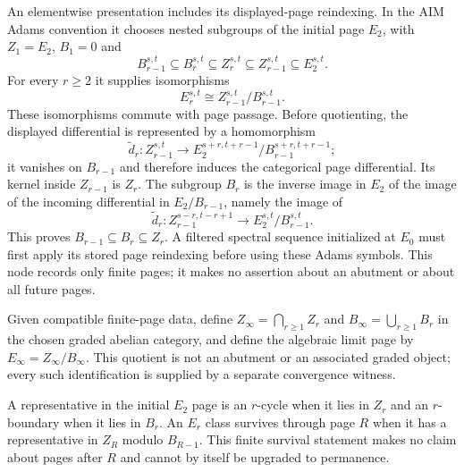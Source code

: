\begin{definition}
  \label{def:ss-elementwise-page-presentation}
  \notready
  An elementwise presentation includes its displayed-page reindexing.  In the
  AIM Adams convention it chooses nested subgroups of the initial page
  $E_2$, with $Z_1=E_2$, $B_1=0$ and
  \[
    B_{r-1}^{s,t}\subseteq B_r^{s,t}\subseteq Z_r^{s,t}
      \subseteq Z_{r-1}^{s,t}\subseteq E_2^{s,t}.
  \]
  For every $r\ge2$ it supplies isomorphisms
  \[
    E_r^{s,t}\cong Z_{r-1}^{s,t}/B_{r-1}^{s,t}.
  \]
  These isomorphisms commute with page passage.  Before quotienting, the
  displayed differential is represented by a homomorphism
  \[
    \widetilde d_r:Z_{r-1}^{s,t}\longrightarrow
    E_2^{s+r,t+r-1}/B_{r-1}^{s+r,t+r-1};
  \]
  it vanishes on $B_{r-1}$ and therefore induces the categorical page
  differential.  Its kernel inside $Z_{r-1}$ is $Z_r$.  The subgroup $B_r$
  is the inverse image in $E_2$ of the image of the incoming differential in
  $E_2/B_{r-1}$, namely the image of
  \[
    \widetilde d_r:Z_{r-1}^{s-r,t-r+1}
      \longrightarrow E_2^{s,t}/B_{r-1}^{s,t}.
  \]
  This proves $B_{r-1}\subseteq B_r\subseteq Z_r$.
  A filtered spectral sequence initialized at $E_0$ must first apply its
  stored page reindexing before using these Adams symbols.  This node records
  only finite pages; it makes no assertion about an abutment or about all
  future pages.
\end{definition}

\begin{definition}
  \label{def:ss-einfty-presentation}
  \notready
  Given compatible finite-page data, define
  $Z_\infty=\bigcap_{r\ge1}Z_r$ and
  $B_\infty=\bigcup_{r\ge1}B_r$ in the chosen graded abelian category, and
  define the algebraic limit page by $E_\infty=Z_\infty/B_\infty$.
  This quotient is not an abutment or an associated graded object; every such
  identification is supplied by a separate convergence witness.
\end{definition}

\begin{definition}
  \label{def:ss-cycle-boundary-survival}
  \notready
  A representative in the initial $E_2$ page is an $r$-cycle when it lies in
  $Z_r$ and an $r$-boundary when it lies in $B_r$.  An $E_r$ class survives
  through page $R$ when it has a representative in $Z_R$ modulo
  $B_{R-1}$.  This finite survival statement makes no claim about pages after
  $R$ and cannot by itself be upgraded to permanence.
\end{definition}

